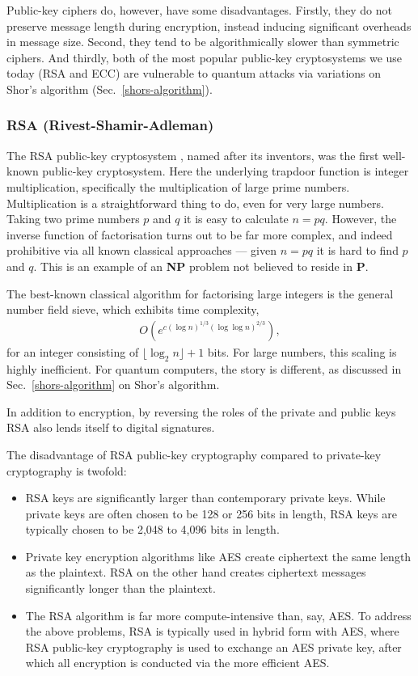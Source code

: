 Public-key ciphers do, however, have some disadvantages. Firstly, they do not preserve message length during encryption, instead inducing significant overheads in message size. Second, they tend to be algorithmically slower than symmetric ciphers. And thirdly, both of the most popular public-key cryptosystems we use today (RSA and ECC) are vulnerable to quantum attacks via variations on Shor's algorithm (Sec.~\ref{shors-algorithm}).

\subsubsection{RSA (Rivest-Shamir-Adleman)} \label{rsa-rivestshamiradleman}

The RSA public-key cryptosystem \cite{bib:RSA}, named after its inventors, was the first well-known public-key cryptosystem. Here the underlying trapdoor function is integer multiplication, specifically the multiplication of large prime numbers. Multiplication is a straightforward thing to do, even for very large numbers. Taking two prime numbers $p$ and $q$ it is easy to calculate $n=pq$. However, the inverse function of factorisation turns out to be far more complex, and indeed prohibitive via all known classical approaches --- given $n=pq$ it is hard to find $p$ and $q$. This is an example of an \textbf{NP} problem not believed to reside in \textbf{P}.

The best-known classical algorithm for factorising large integers is the general number field sieve, which exhibits time complexity,
\begin{align}
	O(e^{c (\log n)^{1/3}(\log\log n)^{2/3}}),
\end{align}
for an integer consisting of $\lfloor\log_2 n\rfloor+1$ bits. For large numbers, this scaling is highly inefficient. For quantum computers, the story is different, as discussed in Sec.~\ref{shors-algorithm} on Shor's algorithm.

In addition to encryption, by reversing the roles of the private and public keys RSA also lends itself to digital signatures.

The disadvantage of RSA public-key cryptography compared to private-key cryptography is twofold:
\begin{itemize}
	\item RSA keys are significantly larger than contemporary private keys. While private keys are often chosen to be 128 or 256 bits in length, RSA keys are typically chosen to be 2,048 to 4,096 bits in length.
	\item Private key encryption algorithms like AES create ciphertext the same length as the plaintext. RSA on the other hand creates ciphertext messages significantly longer than the plaintext.
	\item The RSA algorithm is far more compute-intensive than, say, AES. To address the above problems, RSA is typically used in hybrid form with AES, where RSA public-key cryptography is used to exchange an AES private key, after which all encryption is conducted via the more efficient AES.
\end{itemize}

